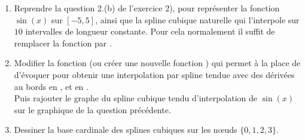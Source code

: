 \documentclass[a4paper,12pt,reqno]{amsart}
\begin{document}
\begin{exo}
\begin{enumerate}
     \item Reprendre la question 2.(b) de l'exercice 2), pour représenter la fonction $\sin(x)$ sur $[-5,5]$, ainsi que la spline cubique naturelle qui l'interpole sur $10$ intervalles de longueur constante. Pour cela normalement il suffit de remplacer la fonction  par .

     \item Modifier la fonction  (ou créer une nouvelle fonction ) qui permet à la place de  d'évoquer  pour obtenir une interpolation par spline tendue avec des dérivées au bords  en , et  en .\\
     Puis rajouter le graphe du spline cubique tendu d'interpolation de $\sin(x)$ sur le graphique de la question précédente.

     \item Dessiner la base cardinale des splines cubiques sur les nœuds $\{0,1,2,3\}$.

  \end{enumerate}
\end{exo}

\end{document}
